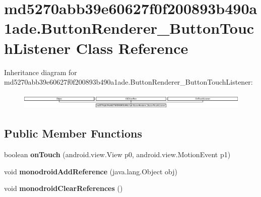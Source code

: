 \hypertarget{classmd5270abb39e60627f0f200893b490a1ade_1_1ButtonRenderer__ButtonTouchListener}{}\section{md5270abb39e60627f0f200893b490a1ade.\+Button\+Renderer\+\_\+\+Button\+Touch\+Listener Class Reference}
\label{classmd5270abb39e60627f0f200893b490a1ade_1_1ButtonRenderer__ButtonTouchListener}
Inheritance diagram for md5270abb39e60627f0f200893b490a1ade.\+Button\+Renderer\+\_\+\+Button\+Touch\+Listener\+:\begin{figure}[H]
\begin{center}
\leavevmode
\includegraphics[height=0.785965cm]{classmd5270abb39e60627f0f200893b490a1ade_1_1ButtonRenderer__ButtonTouchListener}
\end{center}
\end{figure}
\subsection*{Public Member Functions}
\begin{DoxyCompactItemize}
\item 
\mbox{\label{classmd5270abb39e60627f0f200893b490a1ade_1_1ButtonRenderer__ButtonTouchListener_a698aef31ea103a2c7ad4461c6ce0ce98}} 
boolean {\bfseries on\+Touch} (android.\+view.\+View p0, android.\+view.\+Motion\+Event p1)
\item 
\mbox{\label{classmd5270abb39e60627f0f200893b490a1ade_1_1ButtonRenderer__ButtonTouchListener_a8a4f78c3f205a47efb743b43d0d239b9}} 
void {\bfseries monodroid\+Add\+Reference} (java.\+lang.\+Object obj)
\item 
\mbox{\label{classmd5270abb39e60627f0f200893b490a1ade_1_1ButtonRenderer__ButtonTouchListener_abbf99eca09ba5a4f75e2cb5536fcfddc}} 
void {\bfseries monodroid\+Clear\+References} ()
\end{DoxyCompactItemize}
